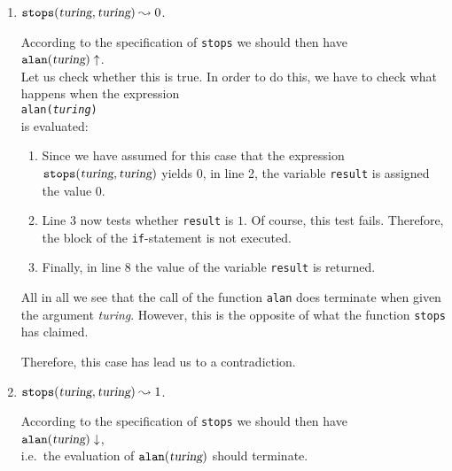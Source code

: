 \begin{enumerate}
\item $\mathtt{stops}(\textsl{turing}, \textsl{turing}) \leadsto 0$. 

      According to the specification of \texttt{stops} we should then have
      \\[0.2cm]
      \hspace*{1.3cm}
      $\mathtt{alan}(\textsl{turing}) \uparrow$.
      \\[0.2cm]
      Let us check whether this is true.  In order to do this, we have to check what happens when
      the expression
      \\[0.2cm]
      \hspace*{1.3cm}
      \texttt{alan(\textsl{turing})} 
      \\[0.2cm]
      is evaluated:
      \begin{enumerate}
      \item Since we have assumed for this case that the expression 
            $\mathtt{stops}(\textsl{turing}, \textsl{turing})$ yields $0$, 
            in line 2, the variable \texttt{result} is assigned the value 0. 
      \item Line 3 now tests whether \texttt{result} is $1$.  Of course,
            this test fails.  Therefore, the block of the \texttt{if}-statement is not executed.
      \item Finally, in line 8 the value of the variable \texttt{result} is returned. 
      \end{enumerate}
      All in all we see that the call of the function \texttt{alan} does terminate when given the argument
      \textsl{turing}.  However, this is the opposite of what the function \texttt{stops} has claimed.
      
      Therefore, this case has lead us to a contradiction.
\item  $\mathtt{stops}(\textsl{turing}, \textsl{turing}) \leadsto 1$. 

      According to the specification of \texttt{stops} we should then have
      \\[0.2cm]
      \hspace*{1.3cm}
      $\mathtt{alan}(\textsl{turing}) \downarrow$, 
      \\[0.2cm]
      i.e.~the evaluation of $\mathtt{alan}(\textsl{turing})$ should terminate.
      

\end{enumerate}
